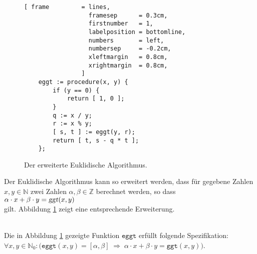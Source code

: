 \begin{figure}[!ht]
\centering
\begin{Verbatim}[ frame         = lines, 
                  framesep      = 0.3cm, 
                  firstnumber   = 1,
                  labelposition = bottomline,
                  numbers       = left,
                  numbersep     = -0.2cm,
                  xleftmargin   = 0.8cm,
                  xrightmargin  = 0.8cm,
                ]
    eggt := procedure(x, y) {
        if (y == 0) {
            return [ 1, 0 ];
        }
        q := x / y;
        r := x % y;
        [ s, t ] := eggt(y, r);
        return [ t, s - q * t ]; 
    };
\end{Verbatim}
\vspace*{-0.3cm}
\caption{Der erweiterte Euklidische Algorithmus.}
\label{fig:eggt.stlx}
\end{figure}

Der Euklidische Algorithmus kann so erweitert werden, dass f\"{u}r gegebene Zahlen $x,y \in \mathbb{N}$
zwei Zahlen $\alpha,\beta \in \mathbb{Z}$ berechnet werden, so dass 
\\[0.2cm]
\hspace*{1.3cm}
$\alpha \cdot x + \beta \cdot y = \textsl{ggt}(x, y)$
\\[0.2cm]
gilt.  Abbildung \ref{fig:eggt.stlx} zeigt eine entsprechende Erweiterung.

\begin{Satz} \hspace*{\fill} \\ 
  Die in Abbildung \ref{fig:eggt.stlx} gezeigte Funktion $\mathtt{eggt}$ erf\"{u}llt
  folgende Spezifikation:
  \\[0.2cm]
  \hspace*{1.3cm}
  $\forall x, y \in \mathbb{N}_0: \bigl(
   \mathtt{eggt}(x, y) = [ \alpha, \beta ] \;\Rightarrow\; 
   \alpha \cdot x + \beta \cdot y = \mathtt{ggt}(x,y)\bigr)
  $.
\end{Satz}

